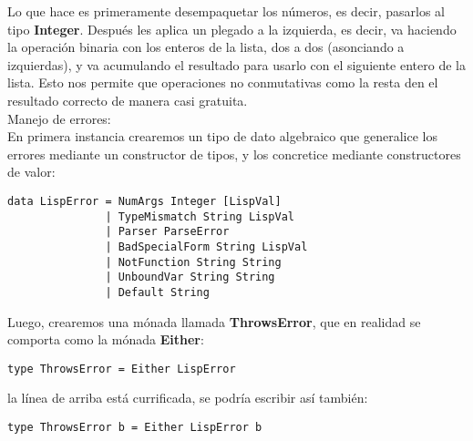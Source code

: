 Lo que hace es primeramente desempaquetar los n\'umeros, es decir, pasarlos al tipo \textbf{Integer}. Despu\'es les aplica un plegado a la izquierda, es decir, va haciendo la operaci\'on binaria con los enteros de la lista, dos a dos (asonciando a izquierdas), y va acumulando el resultado para usarlo con el siguiente entero de la lista. Esto nos permite que operaciones no conmutativas como la resta den el resultado correcto de manera casi gratuita.\\

Manejo de errores:\\

En primera instancia crearemos un tipo de dato algebraico que generalice los errores mediante un constructor de tipos, y los concretice mediante constructores de valor:\\

\begin{minipage}{\linewidth}
\begin{footnotesize}
\begin{lstlisting}[frame=single]
data LispError = NumArgs Integer [LispVal]
               | TypeMismatch String LispVal
               | Parser ParseError
               | BadSpecialForm String LispVal
               | NotFunction String String
               | UnboundVar String String
               | Default String
\end{lstlisting}
\end{footnotesize}
\end{minipage}

Luego, crearemos una m\'onada llamada \textbf{ThrowsError}, que en realidad se comporta como la m\'onada \textbf{Either}:\\

\begin{minipage}{\linewidth}
\begin{footnotesize}
\begin{lstlisting}[frame=single]
type ThrowsError = Either LispError
\end{lstlisting}
\end{footnotesize}
\end{minipage}

la l\'inea de arriba est\'a currificada, se podr\'ia escribir as\'i tambi\'en:\\

\begin{minipage}{\linewidth}
\begin{footnotesize}
\begin{lstlisting}[frame=single]
type ThrowsError b = Either LispError b
\end{lstlisting}
\end{footnotesize}
\end{minipage}

